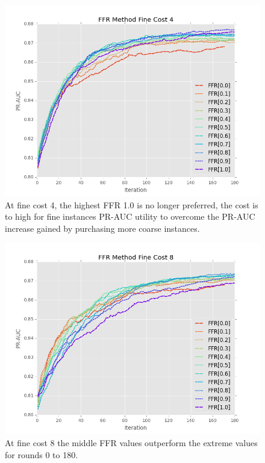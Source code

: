 \documentclass[ms]{nuthesis}
\begin{document}
\FloatBarrier
\begin{figure}[!htb]
	\centering
    \includegraphics[width=1.0\columnwidth]{fig/ParamsFFR_PR_Cost4_rnds0_180}
    \caption{At fine cost 4, the highest FFR 1.0 is no longer preferred, the
    cost is to high for fine instances PR-AUC utility to overcome the PR-AUC
    increase gained by purchasing more coarse instances.}
    \label{fig:ParamsFFR_PR_Cost4_rnds0_180}
\end{figure}
\FloatBarrier


\FloatBarrier
\begin{figure}[!htb]
	\centering
    \includegraphics[width=1.0\columnwidth]{fig/ParamsFFR_PR_Cost8_rnds0_180}
    \caption{At fine cost 8 the middle FFR values outperform the extreme values
    for rounds 0 to 180.}
    \label{fig:ParamsFFR_PR_Cost8_rnds0_180}
\end{figure}
\FloatBarrier
\end{document}
